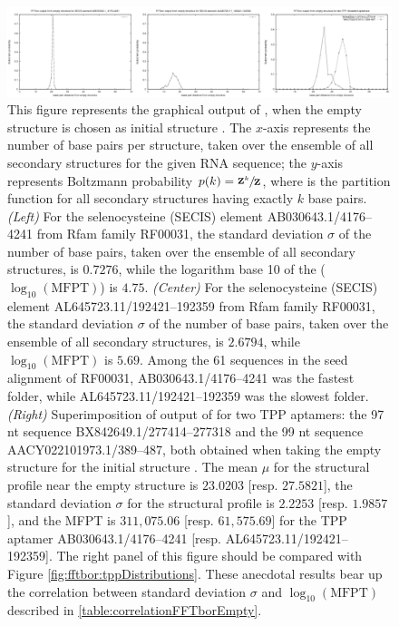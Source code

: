 \begin{figure}[!ht]
\centering
\includegraphics[width=.9\textwidth]{Figures/FFTbor/correlationFFTborEmpty.pdf}
\caption{This figure represents the
graphical output of \fftbor, when the empty structure is chosen as
initial structure \strSt.
The $x$-axis represents the number of base pairs per structure,
taken over the ensemble of all secondary structures for the given RNA
sequence; the $y$-axis represents Boltzmann probability
$p(k) = \sfrac{{\bf Z}^{k}_{}}{{\bf Z}^{}_{}}$,
where \fullZ is the partition function for all secondary structures
having exactly $k$ base pairs.
{\em (Left)}
For the selenocysteine (SECIS) element AB030643.1/4176--4241 from Rfam family
RF00031, the standard deviation $\sigma$ of the number of base pairs,
taken over the ensemble of all secondary structures, is
$0.7276$, while the logarithm base 10 of the \mfpt ($\log_{10}(\text{MFPT})$)
is $4.75$.
{\em (Center)}
For the selenocysteine (SECIS) element
AL645723.11/192421--192359 from Rfam family
RF00031, the standard deviation $\sigma$ of the number of base pairs,
taken over the ensemble of all secondary structures, is
$2.6794$, while $\log_{10}(\text{MFPT})$ is $5.69$.
Among the 61 sequences in the seed alignment of RF00031,
AB030643.1/4176--4241 was the fastest folder, while
AL645723.11/192421--192359 was the slowest folder.
{\em (Right)}
Superimposition of output of \fftbor for two TPP \rb aptamers: the
97 nt sequence BX842649.1/277414--277318 and the
99 nt sequence AACY022101973.1/389--487, both obtained when
taking the empty structure for the initial structure \strSt.
The mean $\mu$ for the \fftbor structural profile near the empty
structure is $23.0203$  [resp. $27.5821$], the
standard deviation $\sigma$ for the \fftbor structural profile
is $2.2253$  [resp. $1.9857$], and the \kinfold MFPT is
$311,075.06$ [resp. $61,575.69$] for the TPP \rb aptamer
AB030643.1/4176--4241 [resp. AL645723.11/192421--192359].
The right panel of this figure should be compared with Figure
\ref{fig:fftbor:tppDistributions}.
These anecdotal results bear up the correlation between standard deviation
$\sigma$ and $\log_{10}(\text{MFPT})$ described in \ref{table:correlationFFTborEmpty}.
}
\label{fig:fftbor:correlationFFTborEmpty}
\end{figure}

